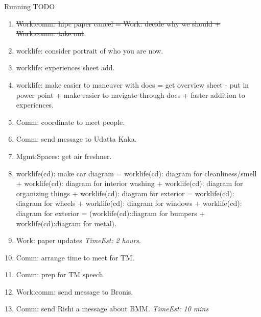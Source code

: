 \documentclass[serif, mathserif, final]{beamer}
\newcommand{\doneTask}[1]{\tiny \item \tiny \sout{#1}}
\newcommand{\te}[1]{\textit{TimeEst:} \textit{#1}}
\begin{document}
\begin{frame}{}
\begin{columns}
\begin{column}{0.50\linewidth}
\begin{block}{Running TODO}
\begin{enumerate}
        \doneTask{ Work:comm: hipc paper cancel  =  Work: decide why
          we should  + Work:comm: take out }


      \item \small worklife: consider portrait of who you are now. 
      \item \small worklife: experiences sheet add. 
      \item \small worklife: make easier to maneuver with docs = get
        overview sheet - put in power point + make easier to navigate
        through docs + faster addition to
        experiences. 

      \item \small Comm: coordinate to meet people. 

      \item \small Comm: send message to Udatta Kaka. 




      \item \small Mgmt:Spaces: get air freshner.

      \item \small worklife(cd): make car diagram = worklife(cd): diagram for
        cleanliness/smell + worklife(cd): diagram for interior washing +
        worklife(cd): diagram for organizing things + worklife(cd): diagram for
        exterior = worklife(cd): diagram for wheels + worklife(cd): diagram
        for windows + worklife(cd): diagram for exterior =
        (worklife(cd):diagram for bumpers + worklife(cd):diagram for
        metal).
      \item \small Work: paper updates \te{2 hours}. 
      \item \small Comm: arrange time to meet for TM. 
      \item \small Comm: prep for TM speech.   
      \item \small Work:comm: send message to Bronis.
      \item \small Comm: send Rishi a message about BMM. \te{10 mins} 
        
        \end{enumerate}
      \end{block} 
     

\end{column}
\end{columns}
\end{frame}
\end{document}
